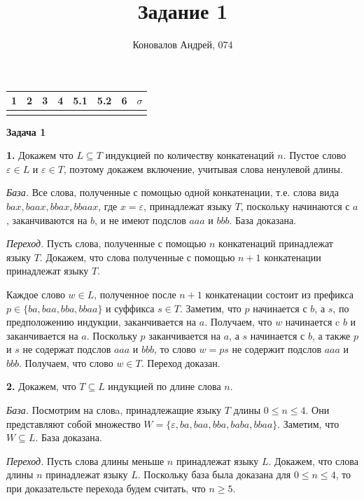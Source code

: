 \documentclass[10pt]{article}
\title{Задание 1}
\author{Коновалов Андрей, 074}
\date{}
\let\eps\varepsilon
\begin{document}
\maketitle

\noindent
{}%
\begin{tabularx}{\textwidth}{|C|C|C|C|C|C|C|C|}
 & 2 & 3 & 4 & 5.1 & 5.2 & 6 & $\sigma$ \\
\hline
&&&&&&& \\
\hline
\end{tabularx}

\bigskip

{\bf Задача 1}

{\bf 1.}
Докажем что $L \subseteq T$ индукцией по количеству конкатенаций $n$. Пустое слово $\eps \in L$ и $\eps \in T$, поэтому докажем включение, учитывая слова ненулевой длины.

{\em База.}
Все слова, полученные с помощью одной конкатенации, т.е. слова вида $bax, baax, bbax, bbaax$, где $x = \eps$, принадлежат языку $T$, поскольку начинаются с $a$, заканчиваются на $b$, и не имеют подслов $aaa$ и $bbb$. База доказана.

{\em Переход.}
Пусть слова, полученные с помощью $n$ конкатенаций принадлежат языку $T$. Докажем, что слова полученные с помощью $n + 1$ конкатенации принадлежат языку $T$.

Каждое слово $w \in L$, полученное после $n + 1$ конкатенации состоит из префикса $p \in \{ba, baa, bba, bbaa\}$ и суффикса $s \in T$. Заметим, что $p$ начинается с $b$, а $s$, по предположению индукции, заканчивается на $a$. Получаем, что $w$ начинается c $b$ и заканчивается на $a$. Поскольку $p$ заканчивается на $a$, а $s$ начинается с $b$, а также $p$ и $s$ не содержат подслов $aaa$ и $bbb$, то слово $w = ps$ не содержит подслов $aaa$ и $bbb$. Получаем, что слово $w \in T$. Переход доказан.

{\bf 2.}
Докажем, что $T \subseteq L$ индукцией по длине слова $n$.

{\em База.}
Посмотрим на словa, принадлежащие языку $T$ длины $0 \leq n \leq 4$. Они представляют собой множество $W = \{ \eps, ba, baa, bba, baba, bbaa\}$. Заметим, что $W \subseteq L$. База доказана.

{\em Переход.} 
Пусть слова длины меньше $n$ принадлежат языку $L$. Докажем, что слова длины $n$ принадлежат языку $L$. Поскольку база была доказана для $0 \leq n \leq 4$, то при доказательсте перехода будем считать, что $n \geq 5$.
\end{document}
